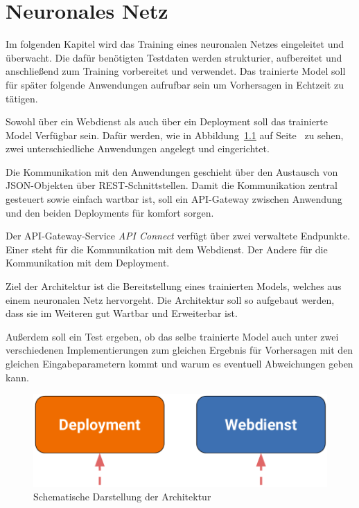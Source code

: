 \chapter{Neuronales Netz}
\label{ch:neuronalesNetz}
Im folgenden Kapitel wird das Training eines neuronalen Netzes eingeleitet und überwacht. Die dafür benötigten Testdaten 
werden strukturier, aufbereitet und anschließend zum Training vorbereitet und verwendet. Das trainierte Model soll für später
folgende Anwendungen aufrufbar sein um Vorhersagen in Echtzeit zu tätigen.

Sowohl über ein Webdienst als auch über ein Deployment soll das trainierte Model Verfügbar sein. Dafür werden, wie in 
Abbildung~\ref{fig:schematische_architektur} auf Seite~\pageref{fig:schematische_architektur} zu sehen, zwei unterschiedliche
Anwendungen angelegt und eingerichtet.

Die Kommunikation mit den Anwendungen geschieht über den Austausch von JSON-Objekten über REST-Schnittstellen. Damit die 
Kommunikation zentral gesteuert sowie einfach wartbar ist, soll ein API-Gateway zwischen Anwendung und den beiden Deployments
für komfort sorgen.  

Der API-Gateway-Service \textit{API Connect} verfügt über zwei verwaltete Endpunkte. Einer steht für die Kommunikation
mit dem Webdienst. Der Andere für die Kommunikation mit dem Deployment.

Ziel der Architektur ist die Bereitstellung eines trainierten Models, welches aus einem neuronalen Netz hervorgeht. Die 
Architektur soll so aufgebaut werden, dass sie im Weiteren gut Wartbar und Erweiterbar ist.

Außerdem soll ein Test ergeben, ob das selbe trainierte Model auch unter zwei verschiedenen Implementierungen zum gleichen 
Ergebnis für Vorhersagen mit den gleichen Eingabeparametern kommt und warum es eventuell Abweichungen geben kann.

\begin{figure}[h]
    \centering
    \includegraphics[scale=0.5]{images/kapitel_3/architektur_schematisch.pdf}
    \caption{Schematische Darstellung der Architektur}
    \label{fig:schematische_architektur}
\end{figure}